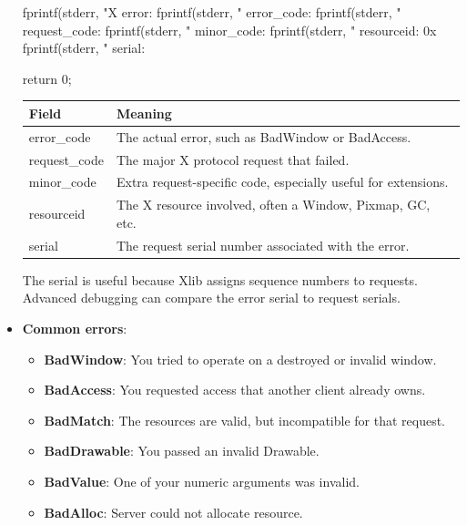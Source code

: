 \documentclass{report}
\begin{document}
\begin{itemize}
\begin{cppcode}
{                    fprintf(stderr, "X error: %
                    fprintf(stderr, "  error_code: %
                    fprintf(stderr, "  request_code: %
                    fprintf(stderr, "  minor_code: %
                    fprintf(stderr, "  resourceid: 0x%
                    fprintf(stderr, "  serial: %

                    return 0;
                }
            \end{cppcode}
            \begin{center}
                \begin{tabularx}{\textwidth}{@{}lX@{}}
                    \toprule
                    \textbf{Field}&	\textbf{Meaning} \\
                    \midrule
                    error\_code	&The actual error, such as BadWindow or BadAccess.\\[2ex]
                    request\_code	&The major X protocol request that failed.\\[2ex]
                    minor\_code	&Extra request-specific code, especially useful for extensions.\\[2ex]
                    resourceid	&The X resource involved, often a Window, Pixmap, GC, etc.\\[2ex]
                    serial	&The request serial number associated with the error. \\
                    \bottomrule
                \end{tabularx}
            \end{center}
            The serial is useful because Xlib assigns sequence numbers to requests. Advanced debugging can compare the error serial to request serials.
        \item \textbf{Common errors}:
            \begin{itemize}
                \item \textbf{BadWindow}:  You tried to operate on a destroyed or invalid window.
                \item \textbf{BadAccess}: You requested access that another client already owns.
                \item \textbf{BadMatch}: The resources are valid, but incompatible for that request.
                \item \textbf{BadDrawable}: You passed an invalid Drawable.
                \item \textbf{BadValue}: One of your numeric arguments was invalid.
                \item \textbf{BadAlloc}: Server could not allocate resource.
            \end{itemize}



    \end{itemize}
\end{document}
